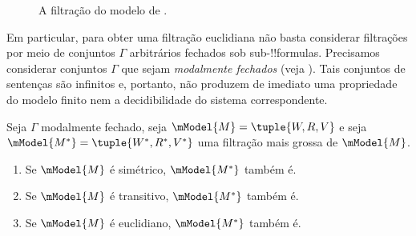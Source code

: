 \documentclass[../../../include/open-logic-section]{subfiles}
\begin{document}
\begin{figure}[ht]
  \centering
  \caption{A filtração do modelo de .}
\end{figure}

Em particular, para obter uma filtração euclidiana não basta considerar
filtrações por meio de conjuntos $\Gamma$ arbitrários fechados sob
sub-!!{formula}s. Precisamos considerar conjuntos $\Gamma$ que sejam
\emph{modalmente fechados} (veja ). Tais
conjuntos de sentenças são infinitos e, portanto, não produzem de imediato
uma propriedade do modelo finito nem a decidibilidade do sistema
correspondente.

\begin{thm}
  Seja $\Gamma$ modalmente fechado, seja $\mModel{M}=\tuple{W,R,V}$ e
  seja $\mModel{M^*} = \tuple{W^*,R^*,V^*}$ uma filtração mais grossa de
  $\mModel{M}$.
  \begin{enumerate}
  \item Se $\mModel{M}$ é simétrico, $\mModel{M^*}$ também é.
  \item Se $\mModel{M}$ é transitivo, $\mModel{M^*}$ também é.
  \item Se $\mModel{M}$ é euclidiano, $\mModel{M^*}$ também é.
  \end{enumerate}
\end{thm}
\end{document}

